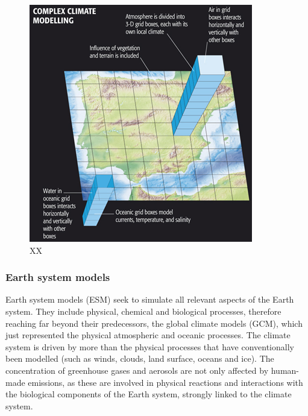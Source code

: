 \documentclass[12pt,oneside]{book}
\begin{document}
\begin{figure}

{\centering \includegraphics[width=0.8\linewidth]{figures/Figure711} 

}

\caption{XX}\label{fig:GeneralCirculationModels}
\end{figure}

\subsubsection{Earth system models}\label{earth-system-models}

Earth system models (ESM) seek to simulate all relevant aspects of the
Earth system. They include physical, chemical and biological processes,
therefore reaching far beyond their predecessors, the global climate
models (GCM), which just represented the physical atmospheric and
oceanic processes. The climate system is driven by more than the
physical processes that have conventionally been modelled (such as
winds, clouds, land surface, oceans and ice). The concentration of
greenhouse gases and aerosols are not only affected by human-made
emissions, as these are involved in physical reactions and interactions
with the biological components of the Earth system, strongly linked to
the climate system.
\end{document}
